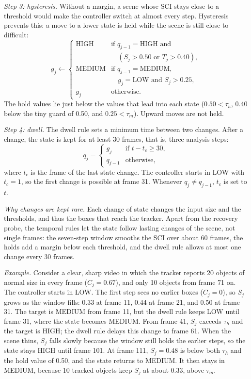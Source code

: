 \documentclass[pdflatex,sn-mathphys-num,iicol]{sn-jnl}
\begin{document}
\emph{Step 3: hysteresis.} Without a margin, a scene whose SCI stays close to
a threshold would make the controller switch at almost every step.
Hysteresis prevents this: a move to a lower state is held while the scene is
still close to difficult:
\begin{equation}
g_j\leftarrow\begin{cases}
\text{HIGH}   & \text{if } q_{j-1}=\text{HIGH} \text{ and}\\
              & \quad (S_j>0.50 \text{ or } T_j>0.40),\\
\text{MEDIUM} & \text{if } q_{j-1}=\text{MEDIUM},\\
              & \quad g_j=\text{LOW} \text{ and } S_j>0.25,\\
g_j           & \text{otherwise.}
\end{cases}
\label{eq:hold}
\end{equation}
The hold values lie just below the values that lead into each state
($0.50<\tau_h$, 0.40 below the tiny guard of 0.50, and $0.25<\tau_m$).
Upward moves are not held.

\emph{Step 4: dwell.} The dwell rule sets a minimum time between two changes.
After a change, the state is kept for at least 30 frames, that is, three
analysis steps:
\begin{equation}
q_j=\begin{cases}
g_j     & \text{if } t-t_c\ge30,\\
q_{j-1} & \text{otherwise,}
\end{cases}
\label{eq:dwell}
\end{equation}
where $t_c$ is the frame of the last state change. The controller starts in
LOW with $t_c=1$, so the first change is possible at frame 31. Whenever
$q_j\ne q_{j-1}$, $t_c$ is set to $t$.

\emph{Why changes are kept rare.} Each change of state changes the input size
and the thresholds, and thus the boxes that reach the tracker. Apart from the
recovery probe, the temporal rules let the state follow lasting changes of
the scene, not single frames: the seven-step window smooths the SCI over about
60 frames, the holds add a margin below each threshold, and the dwell rule
allows at most one change every 30 frames.

\emph{Example.} Consider a clear, sharp video in which the tracker reports 20
objects of normal size in every frame ($C_j=0.67$), and only 10 objects from
frame 71 on. The controller starts in LOW. The first step sees no earlier
boxes ($C_j=0$), so $S_j$ grows as the window fills: 0.33 at frame 11, 0.44
at frame 21, and 0.50 at frame 31. The target is MEDIUM from frame 11, but the
dwell rule keeps LOW until frame 31, where the state becomes MEDIUM. From
frame 41, $S_j$ exceeds $\tau_h$ and the target is HIGH; the dwell rule delays
this change to frame 61. When the scene thins, $S_j$ falls slowly because the
window still holds the earlier steps, so the state stays HIGH until frame 101.
At frame 111, $S_j=0.48$ is below both $\tau_h$ and the hold value of 0.50,
and the state returns to MEDIUM. It then stays in MEDIUM, because 10 tracked
objects keep $S_j$ at about 0.33, above $\tau_m$.
\end{document}
